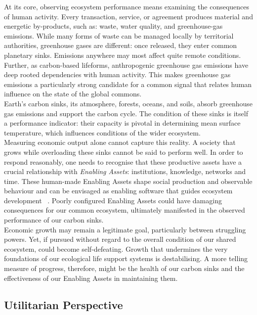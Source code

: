 At its core, observing ecosystem performance means examining the consequences of human activity.
Every transaction, service, or agreement produces material and energetic by-products, such as: waste, water quality, and greenhouse-gas emissions.
While many forms of waste can be managed locally by territorial authorities, greenhouse gases are different: once released, they enter common planetary sinks.
Emissions anywhere may most affect quite remote conditions.
Further, as carbon-based lifeforms, anthropogenic greenhouse gas emissions have deep rooted dependencies with human activity.
This makes greenhouse gas emissions a particularly strong candidate for a common signal that relates human influence on the state of the global commons.\\

Earth’s carbon sinks, its atmosphere, forests, oceans, and soils, absorb greenhouse gas emissions and support the carbon cycle.
The condition of these sinks is itself a performance indicator: their capacity is pivotal in determining mean surface temperature, which influences conditions of the wider ecosystem.\\

Measuring economic output alone cannot capture this reality.
A society that grows while overloading these sinks cannot be said to perform well.
In order to respond reasonably, one needs to recognise that these productive assets have a crucial relationship with \emph{Enabling Assets}: institutions, knowledge, networks and time.
These human-made Enabling Assets shape social production and observable behaviour and can be envisaged as enabling software that guides ecosystem development ~\cite{pd3}.
Poorly configured Enabling Assets could have damaging consequences for our common ecosystem, ultimately manifested in the observed performance of our carbon sinks.\\

Economic growth may remain a legitimate goal, particularly between struggling powers.
Yet, if pursued without regard to the overall condition of our shared ecosystem, could become self-defeating.
Growth that undermines the very foundations of our ecological life support systems is destabilising.
A more telling measure of progress, therefore, might be the health of our carbon sinks and the effectiveness of our Enabling Assets in maintaining them.\\

\subsection{Utilitarian Perspective}

